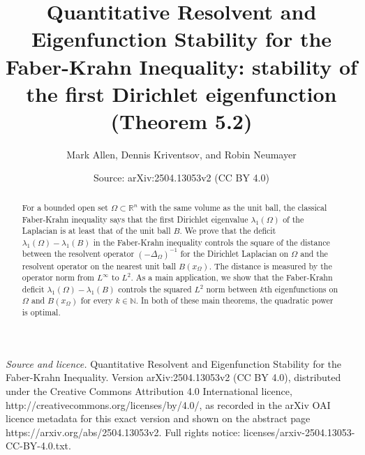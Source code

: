 \documentclass[10pt,a4paper]{amsart}
\title[Quantitative Resolvent and Eigenfunction Stability for the Faber-Krahn Inequality]{Quantitative Resolvent and Eigenfunction Stability for the Faber-Krahn Inequality: stability of the first Dirichlet eigenfunction (Theorem 5.2)}
\author{Mark Allen, Dennis Kriventsov, and Robin Neumayer}
\date{Source: arXiv:2504.13053v2 (CC BY 4.0)}
\numberwithin{equation}{section}
\def\W{\Omega}
\begin{document}
\setcounter{secnumdepth}{4}
\setcounter{tocdepth}{1}
\begin{abstract}
For a bounded open set $\Omega \subset \mathbb{R}^n$ with the same volume as the unit ball, the classical Faber-Krahn inequality says that the first Dirichlet eigenvalue $\lambda_1(\Omega)$ of the Laplacian is at least that of the unit ball $B$. We prove that the deficit $\lambda_1(\W)- \lambda_1(B)$ in the Faber-Krahn inequality controls the square of the distance between the resolvent operator $(-\Delta_\Omega)^{-1}$ for the Dirichlet Laplacian on $\Omega$ and the resolvent operator on the nearest unit ball $B(x_\Omega)$. The distance is measured by the operator norm from $L^{\infty}$ to $L^2$. As a main application, we show that the Faber-Krahn deficit  $\lambda_1(\Omega)- \lambda_1(B)$ controls the squared $L^2$ norm between $k$th eigenfunctions on $\W$ and $B(x_\Omega)$ for every $k \in \mathbb{N}.$ In both of these main theorems, the quadratic power is optimal.
\end{abstract}
\maketitle
\noindent\emph{Source and licence.} Quantitative Resolvent and Eigenfunction Stability for the Faber-Krahn Inequality. Version arXiv:2504.13053v2 (CC BY 4.0), distributed under the Creative Commons Attribution 4.0 International licence, http://creativecommons.org/licenses/by/4.0/, as recorded in the arXiv OAI licence metadata for this exact version and shown on the abstract page https://arxiv.org/abs/2504.13053v2. Full rights notice: licenses/arxiv-2504.13053-CC-BY-4.0.txt.\par\smallskip
\end{document}
